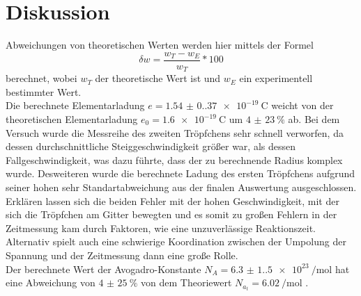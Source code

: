 \section{Diskussion}

Abweichungen von theoretischen Werten werden hier mittels der Formel
\begin{equation}
    \delta w=\frac{w_T-w_E}{w_T}*100
\end{equation}
berechnet, wobei $w_T$ der theoretische Wert ist und $w_E$ ein experimentell bestimmter Wert.\\
\noindent Die berechnete Elementarladung $e=\qty{1.54(0.37)e-19}{\coulomb}$ weicht von der theoretischen Elementarladung
$e_0=\qty{1.6e-19}{\coulomb}$ um $\qty{4(23)}{\percent}$ ab. Bei dem Versuch wurde die Messreihe des zweiten 
Tröpfchens sehr schnell verworfen, da dessen durchschnittliche Steiggeschwindigkeit größer war, als dessen 
Fallgeschwindigkeit, was dazu führte, dass der zu berechnende Radius komplex wurde. Desweiteren wurde die berechnete
Ladung des ersten Tröpfchens aufgrund seiner hohen sehr Standartabweichung aus der finalen Auswertung ausgeschlossen.
Erklären lassen sich die beiden Fehler mit der hohen Geschwindigkeit, mit der sich die Tröpfchen am Gitter bewegten
und es somit zu großen Fehlern in der Zeitmessung kam durch Faktoren, wie eine unzuverlässige Reaktionszeit.
Alternativ spielt auch eine schwierige Koordination zwischen der Umpolung der Spannung und der Zeitmessung 
dann eine große Rolle.\\
\noindent Der berechnete Wert der Avogadro-Konstante $N_A=\qty{6.3(1.5)e23}{\per\mole}$ hat eine Abweichung von
$\qty{4(25)}{\percent}$ von dem Theoriewert $N_{a_t}=\qty{6.02}{\per\mole}$ \cite{Avo}.
\label{sec:Diskussion}
